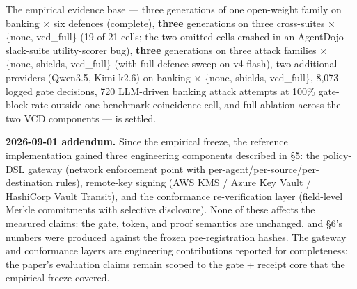 The empirical evidence base --- three generations of one open-weight
family on banking × six defences (complete), \textbf{three} generations
on three cross-suites × \{none, vcd\_full\} (19 of 21 cells; the two
omitted cells crashed in an AgentDojo slack-suite utility-scorer bug),
\textbf{three} generations on three attack families × \{none, shields,
vcd\_full\} (with full defence sweep on v4-flash), two additional
providers (Qwen3.5, Kimi-k2.6) on banking × \{none, shields,
vcd\_full\}, 8,073 logged gate decisions, 720 LLM-driven banking attack
attempts at 100\% gate-block rate outside one benchmark coincidence
cell, and full ablation across the two VCD components --- is settled.

\textbf{2026-09-01 addendum.} Since the empirical freeze, the reference
implementation gained three engineering components described in §5: the
policy-DSL gateway (network enforcement point with
per-agent/per-source/per-destination rules), remote-key signing (AWS KMS
/ Azure Key Vault / HashiCorp Vault Transit), and the conformance
re-verification layer (field-level Merkle commitments with selective
disclosure). None of these affects the measured claims: the gate, token,
and proof semantics are unchanged, and §6's numbers were produced
against the frozen pre-registration hashes. The gateway and conformance
layers are engineering contributions reported for completeness; the
paper's evaluation claims remain scoped to the gate + receipt core that
the empirical freeze covered.
